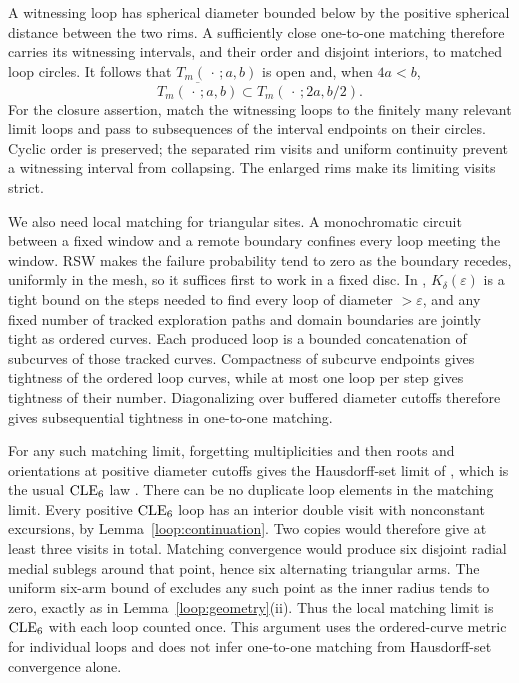 A witnessing loop has spherical diameter bounded below by the
positive spherical distance between the two rims.  A sufficiently
close one-to-one matching therefore carries its witnessing intervals,
and their order and disjoint interiors, to matched loop circles.
It follows that $T_m(\,\cdot\,;a,b)$ is open and, when $4a<b$,
\begin{equation}\label{perc:even-closure}
 \overline{T_m(\,\cdot\,;a,b)}
 \subset T_m(\,\cdot\,;2a,b/2).
\end{equation}
For the closure assertion, match the witnessing loops to the finitely
many relevant limit loops and pass to subsequences of the interval
endpoints on their circles.  Cyclic order is preserved; the separated
rim visits and uniform continuity prevent a witnessing interval from
collapsing.  The enlarged rims make its limiting visits strict.

We also need local matching for triangular sites.  A monochromatic
circuit between a fixed window and a remote boundary confines every
loop meeting the window.  RSW makes the failure probability tend to
zero as the boundary recedes, uniformly in the mesh, so it suffices
first to work in a fixed disc.  In
\citet[Theorem~5]{CamiaNewman2006Full}, $K_\delta(\varepsilon)$ is a
tight bound on the steps needed to find every loop of diameter
$>\varepsilon$, and any fixed number of tracked exploration paths and
domain boundaries are jointly tight as ordered curves.  Each produced
loop is a bounded concatenation of subcurves of those tracked curves.
Compactness of subcurve endpoints gives tightness of the ordered loop
curves, while at most one loop per step gives tightness of their
number.  Diagonalizing over buffered diameter cutoffs therefore gives
subsequential tightness in one-to-one matching.

For any such matching limit, forgetting multiplicities and then roots
and orientations at positive diameter cutoffs gives the Hausdorff-set
limit of \citet[Theorem~1]{CamiaNewman2006Full}, which is the usual
$\operatorname{CLE}_6$ law \citep[Section~1.1]{Sheffield2009Exploration}.  There can be no
duplicate loop elements in the matching limit.  Every positive
$\operatorname{CLE}_6$ loop has an interior double visit with nonconstant
excursions, by Lemma~\ref{loop:continuation}.  Two copies would
therefore give at least three visits in total.  Matching convergence
would produce six disjoint radial medial sublegs around that point,
hence six alternating triangular arms.  The uniform six-arm bound of
\citet[Lemma~6.1]{CamiaNewman2006Full} excludes any such point as the
inner radius tends to zero, exactly as in
Lemma~\ref{loop:geometry}(ii).  Thus the local matching limit is
$\operatorname{CLE}_6$ with each loop counted once.  This argument uses the
ordered-curve metric for individual loops and does not infer
one-to-one matching from Hausdorff-set convergence alone.

